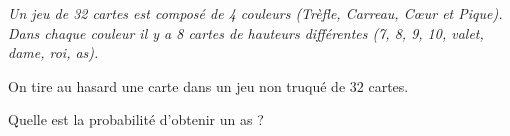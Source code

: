
\textit{Un jeu de 32 cartes est composé de 4 couleurs (Trèfle, Carreau, Cœur et Pique). Dans chaque couleur il y a 8 cartes de hauteurs différentes (7, 8, 9, 10, valet, dame, roi, as).}

\medskip

On tire au hasard une carte dans un jeu non truqué de $32$ cartes.

Quelle est la probabilité d'obtenir un as ?

\smallskip
{}
